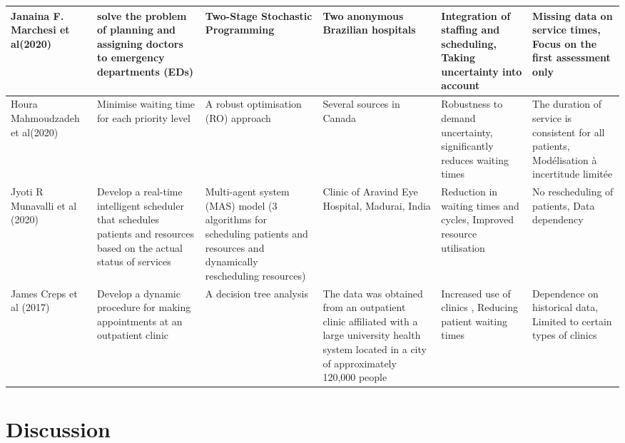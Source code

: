 \documentclass[runningheads]{llncs}
\begin{document}
\begin{landscape}
\begin{longtable}{|p{3cm}|p{3cm}|p{4cm}|p{3cm}|p{3cm}|p{3cm}|}
\hline
\cite{marchesi2020physician} Janaina F. Marchesi et al(2020)&solve the problem of planning and assigning doctors to emergency departments (EDs)&Two-Stage Stochastic Programming&Two anonymous Brazilian hospitals &Integration of staffing and scheduling, Taking uncertainty into account&Missing data on service times, Focus on the first assessment only\\
\hline
\cite{mahmoudzadeh2020robust}Houra Mahmoudzadeh et al(2020) & Minimise waiting time for each priority level
&A robust optimisation (RO) approach &Several sources in Canada &Robustness to demand uncertainty, significantly reduces waiting times&The duration of service is consistent for all patients, Modélisation à incertitude limitée\\
\hline
\cite{munavalli2020mas} Jyoti R Munavalli et al (2020) & Develop a real-time intelligent scheduler that schedules patients and resources based on the actual status of services&Multi-agent system (MAS) model (3 algorithms for scheduling patients and resources and dynamically rescheduling resources)&Clinic of Aravind Eye Hospital, Madurai, India&Reduction in waiting times and cycles, Improved resource utilisation&No rescheduling of patients, Data dependency\\
\hline
\cite{creps2017outpatient} James Creps et al (2017) &Develop a dynamic procedure for making appointments at an outpatient clinic&A decision tree analysis & The data was obtained from an outpatient clinic affiliated with a large university health system located in a city of approximately 120,000 people&Increased use of clinics
, Reducing patient waiting times&Dependence on historical data, Limited to certain types of clinics\\
\hline
\end{longtable}

\end{landscape}
\section{Discussion}
\end{document}
